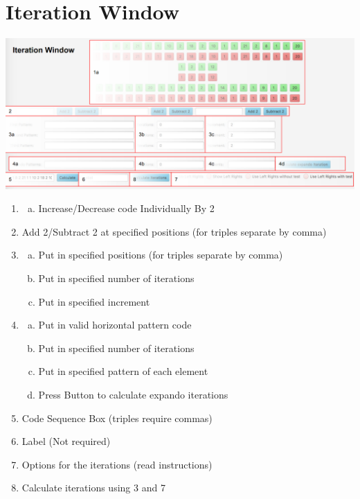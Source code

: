 \documentclass[11pt]{report}
\begin{document}
\section{Iteration Window}\label{iterwin}
\includegraphics[scale=0.23]{iteration_window}
\begin{enumerate}
  \item
  \begin{enumerate}[a.]
    \item Increase/Decrease code Individually By 2
  \end{enumerate}
  \item Add 2/Subtract 2 at specified positions (for triples separate by comma)
  \item
  \begin{enumerate}[a.]
    \item Put in specified positions (for triples separate by comma)
    \item Put in specified number of iterations
    \item Put in specified increment
  \end{enumerate}
  \item
  \begin{enumerate}[a.]
    \item Put in valid horizontal pattern code
    \item Put in specified number of iterations
    \item Put in specified pattern of each element
    \item Press Button to calculate expando iterations
  \end{enumerate}
  \item Code Sequence Box (triples require commas)
  \item Label (Not required)
  \item Options for the iterations (read instructions)
  \item Calculate iterations using 3 and 7
\end{enumerate}
\end{document}
